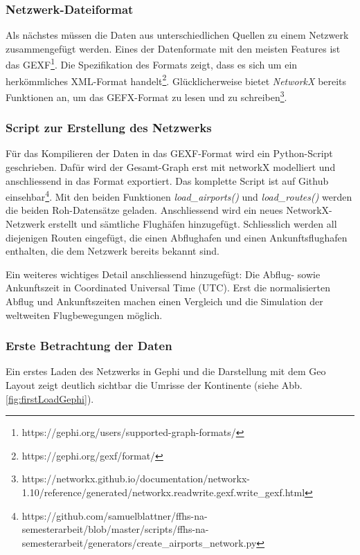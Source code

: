 \subsubsection{Netzwerk-Dateiformat}
\label{subsec:networkFileformat}
Als nächstes müssen die Daten aus unterschiedlichen Quellen zu einem Netzwerk zusammengefügt werden.
Eines der Datenformate mit den meisten Features ist das GEXF\footnote{https://gephi.org/users/supported-graph-formats/}.
Die Spezifikation des Formats zeigt, dass es sich um ein herkömmliches XML-Format handelt\footnote{https://gephi.org/gexf/format/}.
Glücklicherweise bietet \textit{NetworkX} bereits Funktionen an, um das GEFX-Format zu lesen und zu schreiben\footnote{https://networkx.github.io/documentation/networkx-1.10/reference/generated/networkx.readwrite.gexf.write\_gexf.html}.


\subsubsection{Script zur Erstellung des Netzwerks}
Für das Kompilieren der Daten in das GEXF-Format wird ein Python-Script geschrieben.
Dafür wird der Gesamt-Graph erst mit networkX modelliert und anschliessend in das Format exportiert.
Das komplette Script ist auf Github einsehbar\footnote{https://github.com/samuelblattner/ffhs-na-semesterarbeit/blob/master/scripts/ffhs-na-semesterarbeit/generators/create\_airports\_network.py}.
Mit den beiden Funktionen \textit{load\_airports()} und \textit{load\_routes()} werden die beiden Roh-Datensätze geladen.
Anschliessend wird ein neues NetworkX-Netzwerk erstellt und sämtliche Flughäfen hinzugefügt.
Schliesslich werden all diejenigen Routen eingefügt, die einen Abflughafen und einen Ankunftsflughafen enthalten, die
dem Netzwerk bereits bekannt sind.

Ein weiteres wichtiges Detail anschliessend hinzugefügt: Die Abflug- sowie Ankunftszeit in Coordinated Universal Time (UTC).
Erst die normalisierten Abflug und Ankunftszeiten machen einen Vergleich und die Simulation der weltweiten Flugbewegungen möglich.


\subsubsection{Erste Betrachtung der Daten}
Ein erstes Laden des Netzwerks in Gephi und die Darstellung mit dem \guillemotleft Geo Layout \guillemotright zeigt
deutlich sichtbar die Umrisse der Kontinente (siehe Abb. \ref{fig:firstLoadGephi}).

